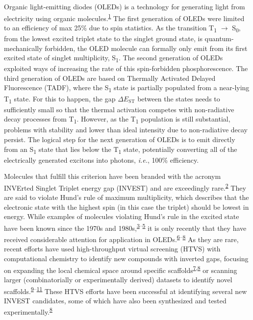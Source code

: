 \documentclass[
  number,
  3p]{elsarticle}
\newcommand{\DeltaE}[2][]{\Delta E^{\mathrm{#1}}_{\mathrm{#2}}}
\begin{document}
Organic light-emitting diodes (OLEDs) is a technology for generating
light from electricity using organic
molecules.\textsuperscript{\protect\hyperlink{ref-yangRecentAdvancesOrganic2017}{1}}
The first generation of OLEDs were limited to an efficiency of max 25\%
due to spin statistics. As the transition T\textsubscript{1}
\(\rightarrow\) S\textsubscript{0}, from the lowest excited triplet
state to the singlet ground state, is quantum-mechanically forbidden,
the OLED molecule can formally only emit from its first excited state of
singlet multiplicity, S\textsubscript{1}. The second generation of OLEDs
exploited ways of increasing the rate of this spin-forbidden
phosphorescence. The third generation of OLEDs are based on Thermally
Activated Delayed Fluorescence (TADF), where the S\textsubscript{1}
state is partially populated from a near-lying T\textsubscript{1} state.
For this to happen, the gap \(\DeltaE{ST}\) between the states needs to
sufficiently small so that the thermal activation competes with
non-radiative decay processes from T\textsubscript{1}. However, as the
T\textsubscript{1} population is still substantial, problems with
stability and lower than ideal intensity due to non-radiative decay
persist. The logical step for the next generation of OLEDs is to emit
directly from an S\textsubscript{1} state that lies below the
T\textsubscript{1} state, potentially converting all of the electrically
generated excitons into photons, \emph{i.e.}, 100\% efficiency.

Molecules that fulfill this criterion have been branded with the acronym
INVErted Singlet Triplet energy gap (INVEST) and are exceedingly
rare.\textsuperscript{\protect\hyperlink{ref-liOrganicMoleculesInverted2022}{2}}
They are said to violate Hund's rule of maximum multiplicity, which
describes that the electronic state with the highest spin (in this case
the triplet) should be lowest in energy. While examples of molecules
violating Hund's rule in the excited state have been known since the
1970s and
1980s,\textsuperscript{\protect\hyperlink{ref-kollmarViolationHundRule1978}{3}--\protect\hyperlink{ref-kosekiViolationHundMultiplicity1985}{5}}
it is only recently that they have received considerable attention for
application in
OLEDs.\textsuperscript{\protect\hyperlink{ref-desilvaInvertedSingletTriplet2019}{6}--\protect\hyperlink{ref-aizawaDelayedFluorescenceInverted2022}{8}}
As they are rare, recent efforts have used high-throughput virtual
screening (HTVS) with computational chemistry to identify new compounds
with inverted gaps, focusing on expanding the local chemical space
around specific
scaffolds\textsuperscript{\protect\hyperlink{ref-polliceOrganicMoleculesInverted2021}{7},\protect\hyperlink{ref-aizawaDelayedFluorescenceInverted2022}{8}}
or scanning larger (combinatorially or experimentally derived) datasets
to identify novel
scaffolds.\textsuperscript{\protect\hyperlink{ref-terenceblaskovitsSymmetryInducedSinglet2023}{9}--\protect\hyperlink{ref-garnerDoublebondDelocalizationNonalternant2023}{11}}
These HTVS efforts have been successful at identifying several new
INVEST candidates, some of which have also been synthesized and tested
experimentally.\textsuperscript{\protect\hyperlink{ref-aizawaDelayedFluorescenceInverted2022}{8}}
\end{document}
